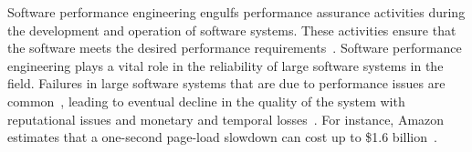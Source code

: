 




Software performance engineering engulfs performance assurance activities during the development and operation of software systems. These activities ensure that the software meets the desired performance requirements~\cite{futureofspe}. Software performance engineering plays a vital role in the reliability of large software systems in the field. Failures in large software systems that are due to performance issues are common~\cite{tailatscale, foo2010mining}, leading to eventual decline in the quality of the system with reputational issues and monetary and temporal losses~\cite{costofdowntime}. For instance, Amazon estimates that a one-second page-load slowdown can cost up to \$1.6 billion~\cite{amazononesec}. 

